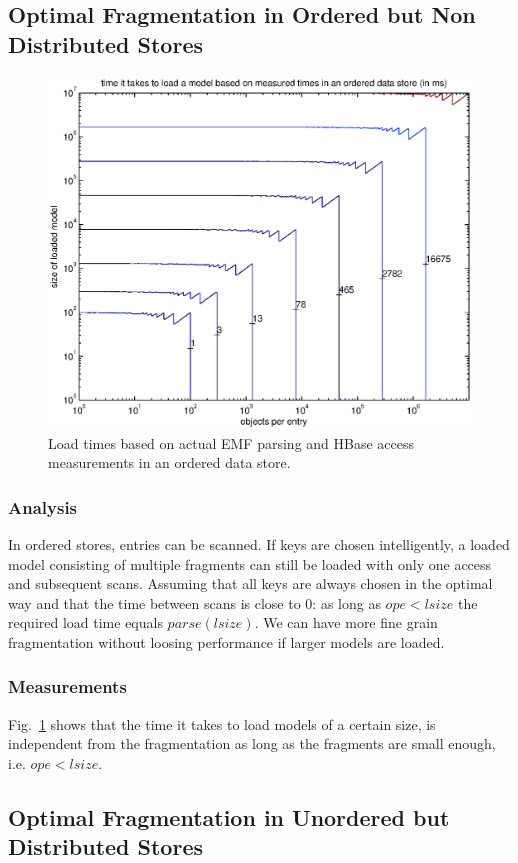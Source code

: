 \subsection{Optimal Fragmentation in Ordered but Non Distributed Stores}

\begin{figure}
  \centering
  \includegraphics[width=0.65\linewidth]{figures/optimal_load_times_measured_ordered}
  \caption{Load times based on actual EMF parsing and HBase access measurements in an ordered data store.}
  \label{fig:optimal_load_times_measured_ordered}
\end{figure}

\subsubsection{Analysis}
In ordered stores, entries can be scanned. 
If keys are chosen intelligently, a loaded model consisting of multiple fragments can still be loaded with only one access and subsequent scans.
Assuming that all keys are always chosen in the optimal way and that the time between scans is close to 0: as long as $ope<lsize$ the required load time equals $parse(lsize)$. We can have more fine grain fragmentation without loosing performance if larger models are loaded. 

\subsubsection{Measurements}
Fig.~\ref{fig:optimal_load_times_measured_ordered} shows that the time it takes to load models of a certain size, is independent from the fragmentation as long as the fragments are small enough, i.e. $ope<lsize$.

\subsection{Optimal Fragmentation in Unordered but Distributed Stores}
